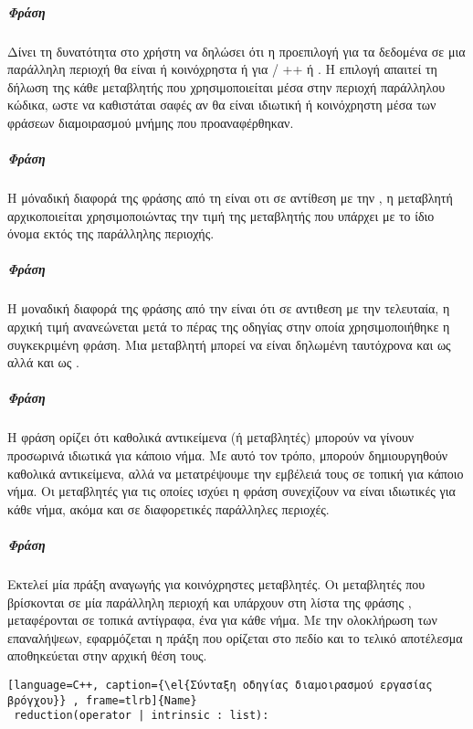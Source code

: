 \subparagraph{Φράση \emph{}}
\subparagraph{}
Δίνει τη δυνατότητα στο χρήστη να δηλώσει ότι η προεπιλογή για τα δεδομένα σε μια παράλληλη περιοχή θα είναι ή κοινόχρηστα ή \emph{} για  / ++ ή {}. Η επιλογή \emph{} απαιτεί τη δήλωση της κάθε μεταβλητής που χρησιμοποιείται μέσα στην περιοχή παράλληλου κώδικα, ωστε να καθιστάται σαφές αν θα είναι ιδιωτική ή κοινόχρηστη μέσα των φράσεων διαμοιρασμού μνήμης που προαναφέρθηκαν.

\subparagraph{Φράση \emph{}}
\subparagraph{}
Η μόναδική διαφορά της φράσης \emph{} από τη \emph{} είναι οτι σε αντίθεση με την \emph{}, η μεταβλητή αρχικοποιείται χρησιμοποιώντας την τιμή της μεταβλητής που υπάρχει με το ίδιο όνομα εκτός της παράλληλης περιοχής.

\subparagraph{Φράση \emph{}}
\subparagraph{}
Η μοναδική διαφορά της φράσης \emph{} από την \emph{} είναι ότι σε αντιθεση με την τελευταία, η αρχική τιμή ανανεώνεται μετά το πέρας της οδηγίας στην οποία χρησιμοποιήθηκε η συγκεκριμένη φράση. Μια μεταβλητή μπορεί να είναι δηλωμένη ταυτόχρονα και ως \emph{} αλλά και ως \emph{}.

\clearpage
\subparagraph{Φράση \emph{}}
\subparagraph{}
Η φράση \emph{} ορίζει ότι καθολικά αντικείμενα (ή μεταβλητές) μπορούν να γίνουν προσωρινά ιδιωτικά για κάποιο νήμα. Με αυτό τον τρόπο, μπορούν δημιουργηθούν καθολικά αντικείμενα, αλλά να μετατρέψουμε την εμβέλειά τους σε τοπική για κάποιο νήμα. Οι μεταβλητές για τις οποίες ισχύει η φράση \emph{} συνεχίζουν να είναι ιδιωτικές για κάθε νήμα, ακόμα και σε διαφορετικές παράλληλες περιοχές\cite{pdplab}.

\subparagraph{Φράση \emph{}}
\subparagraph{}
Εκτελεί μία πράξη αναγωγής για κοινόχρηστες μεταβλητές. Οι μεταβλητές που βρίσκονται σε μία παράλληλη περιοχή και υπάρχουν στη λίστα της φράσης \emph{}, μεταφέρονται σε τοπικά αντίγραφα, ένα για κάθε νήμα. Με την ολοκλήρωση των επαναλήψεων, εφαρμόζεται η πράξη που ορίζεται στο πεδίο \emph{} και το τελικό αποτέλεσμα αποθηκεύεται στην αρχική θέση τους\cite{pdplab}.
\begin{lstlisting}[language=C++, caption={\el{Σύνταξη οδηγίας διαμοιρασμού εργασίας βρόγχου}} , frame=tlrb]{Name}
 reduction(operator | intrinsic : list):\end{lstlisting}

